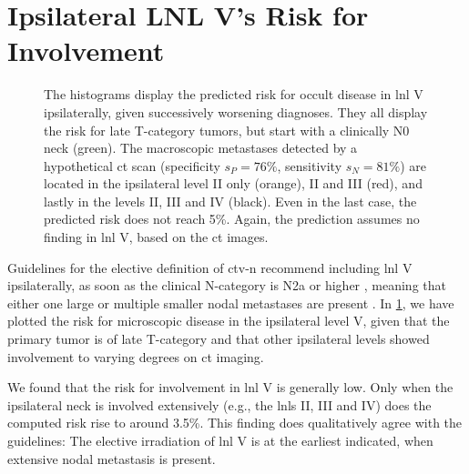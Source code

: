 \documentclass[\relativeRoot/main.tex]{subfiles}
\begin{document}
\section[Ipsilateral LNL V's Risk for Involvement]{Ipsilateral LNL V's Risk for Involvement}
\label{sec:complete:ipsiV}

\begin{figure}
    \centering
    \def\svgwidth{1.0\textwidth}
    
    \caption[
        Computed risks of involvement for ipsilateral LNL V
    ]{
        The histograms display the predicted risk for occult disease in \gls{lnl} V ipsilaterally, given successively worsening diagnoses. They all display the risk for late T-category tumors, but start with a clinically N0 neck (green). The macroscopic metastases detected by a hypothetical \gls{ct} scan (specificity $s_P = 76\%$, sensitivity $s_N = 81\%$) are located in the ipsilateral level II only (orange), II and III (red), and lastly in the levels II, III and IV (black). Even in the last case, the predicted risk does not reach 5\%. Again, the prediction assumes no finding in \gls{lnl} V, based on the \gls{ct} images.
    }
    \label{fig:complete:ipsiV}
\end{figure}

Guidelines for the elective definition of \gls{ctv-n} recommend including \gls{lnl} V ipsilaterally, as soon as the clinical N-category is N2a or higher \cite{biau_selection_2019}, meaning that either one large or multiple smaller nodal metastases are present \cite{brierley_tnm_2017}. In \cref{fig:complete:ipsiV}, we have plotted the risk for microscopic disease in the ipsilateral level V, given that the primary tumor is of late T-category and that other ipsilateral levels showed involvement to varying degrees on \gls{ct} imaging.

We found that the risk for involvement in \gls{lnl} V is generally low. Only when the ipsilateral neck is involved extensively (e.g., the \glspl{lnl} II, III and IV) does the computed risk rise to around 3.5\%. This finding does qualitatively agree with the guidelines: The elective irradiation of \gls{lnl} V is at the earliest indicated, when extensive nodal metastasis is present.
\end{document}

